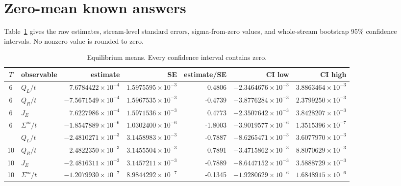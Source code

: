 \documentclass[11pt]{article}
\begin{document}
\section{Zero-mean known answers}

Table~\ref{tab:means} gives the raw estimates, stream-level standard errors,
sigma-from-zero values, and whole-stream bootstrap 95\% confidence intervals.
No nonzero value is rounded to zero.

\begin{table}[ht]
\centering
\scriptsize
\setlength{\tabcolsep}{3.5pt}
\caption{Equilibrium means.  Every confidence interval contains zero.}
\label{tab:means}
\begin{tabular}{c l r r r r r}
\toprule
\(T\) & observable & estimate & SE & estimate/SE & CI low & CI high \\
\midrule
6 & \(Q_L/t\) & \( 7.6784422\!\times10^{-4}\) & \(1.5975595\!\times10^{-3}\) &  0.4806 & \(-2.3464676\!\times10^{-3}\) & \( 3.8863464\!\times10^{-3}\) \\
6 & \(Q_R/t\) & \(-7.5671549\!\times10^{-4}\) & \(1.5967535\!\times10^{-3}\) & -0.4739 & \(-3.8776284\!\times10^{-3}\) & \( 2.3799250\!\times10^{-3}\) \\
6 & \(J_E\)   & \( 7.6227986\!\times10^{-4}\) & \(1.5971536\!\times10^{-3}\) &  0.4773 & \(-2.3507642\!\times10^{-3}\) & \( 3.8428207\!\times10^{-3}\) \\
6 & \(\Sigma^m/t\) & \(-1.8547889\!\times10^{-6}\) & \(1.0302400\!\times10^{-6}\) & -1.8003 & \(-3.9019577\!\times10^{-6}\) & \( 1.3515396\!\times10^{-7}\) \\
\addlinespace
10 & \(Q_L/t\) & \(-2.4810271\!\times10^{-3}\) & \(3.1458983\!\times10^{-3}\) & -0.7887 & \(-8.6265471\!\times10^{-3}\) & \( 3.6077970\!\times10^{-3}\) \\
10 & \(Q_R/t\) & \( 2.4822350\!\times10^{-3}\) & \(3.1455504\!\times10^{-3}\) &  0.7891 & \(-3.4715862\!\times10^{-3}\) & \( 8.8070629\!\times10^{-3}\) \\
10 & \(J_E\)   & \(-2.4816311\!\times10^{-3}\) & \(3.1457211\!\times10^{-3}\) & -0.7889 & \(-8.6447152\!\times10^{-3}\) & \( 3.5888729\!\times10^{-3}\) \\
10 & \(\Sigma^m/t\) & \(-1.2079930\!\times10^{-7}\) & \(8.9844292\!\times10^{-7}\) & -0.1345 & \(-1.9280629\!\times10^{-6}\) & \( 1.6848915\!\times10^{-6}\) \\
\bottomrule
\end{tabular}
\end{table}
\end{document}

